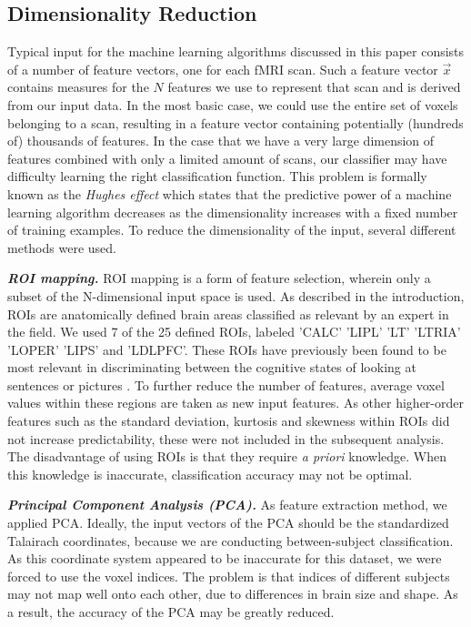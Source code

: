 \documentclass[preprint,journal,11pt]{vgtc}
\begin{document}
\subsection{Dimensionality Reduction}
\label{sec:dimensionalityReduction}
Typical input for the machine learning algorithms discussed in this paper consists of a number of feature vectors, one for each fMRI scan. Such a feature vector $\vec{x}$ contains measures for the $N$ features we use to represent that scan and is derived from our input data. In the most basic case, we could use the entire set of voxels belonging to a scan, resulting in a feature vector containing potentially (hundreds of) thousands of features.
In the case that we have a very large dimension of features combined with only a limited amount of scans, our classifier may have difficulty learning the right classification function. This problem is formally known as the \textit{Hughes effect}\cite{Hughes1054102} which states that the predictive power of a machine learning algorithm decreases as the dimensionality increases with a fixed number of training examples. To reduce the dimensionality of the input, several different methods were used.

\textbf{\emph{ROI mapping.}} ROI mapping is a form of feature selection, wherein only a subset of the N-dimensional input space is used. As described in the introduction, ROIs are anatomically defined brain areas classified as relevant by an expert in the field. We used 7 of the 25 defined ROIs, labeled  'CALC' 'LIPL' 'LT' 'LTRIA' 'LOPER' 'LIPS' and  'LDLPFC'. These ROIs have previously been found to be most relevant in discriminating between the cognitive states of looking at sentences or pictures \cite{wa:2003betw}. To further reduce the number of features, average voxel values within these regions are taken as new input features. As other higher-order features such as the standard deviation, kurtosis and skewness within ROIs did not increase predictability, these were not included in the subsequent analysis. The disadvantage of using ROIs is that they require \textit{a priori} knowledge. When this knowledge is inaccurate, classification accuracy may not be optimal.

\textbf{\emph{Principal Component Analysis (PCA).}} As feature extraction method, we applied PCA. Ideally, the input vectors of the PCA should be the standardized Talairach coordinates, because we are conducting between-subject classification. As this coordinate system appeared to be inaccurate for this dataset, we were forced to use the voxel indices. The problem is that indices of different subjects may not map well onto each other, due to differences in brain size and shape. As a result, the accuracy of the PCA may be greatly reduced.   
\end{document}
